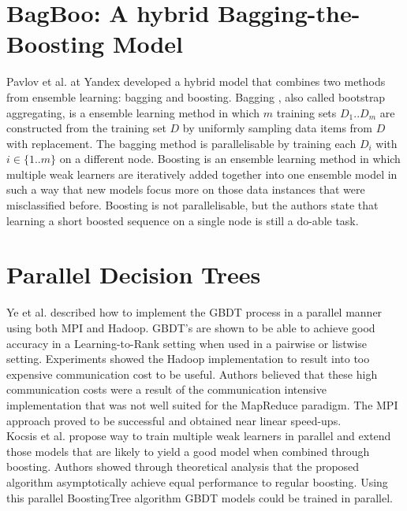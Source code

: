 \section{BagBoo: A hybrid Bagging-the-Boosting Model}
Pavlov et al. \cite{Pavlov2010} at Yandex developed a hybrid model that combines two methods from ensemble learning: bagging and boosting. Bagging \cite{Breiman1996}, also called bootstrap aggregating, is a ensemble learning method in which $m$ training sets $D_1..D_m$ are constructed from the training set $D$ by uniformly sampling data items from $D$ with replacement. The bagging method is parallelisable by training each $D_i$ with $i \in \{1..m\}$ on a different node. Boosting \cite{Friedman2002} is an ensemble learning method in which multiple weak learners are iteratively added together into one ensemble model in such a way that new models focus more on those data instances that were misclassified before. Boosting is not parallelisable, but the authors state that learning a short boosted sequence on a single node is still a do-able task.
\section{Parallel Decision Trees}
Ye et al. \cite{Ye2009} described how to implement the \ac{GBDT} process in a parallel manner using both MPI and Hadoop. \ac{GBDT}'s are shown to be able to achieve good accuracy in a Learning-to-Rank setting when used in a pairwise \cite{Zheng2007} or listwise \cite{Chen2008} setting. Experiments showed the Hadoop implementation to result into too expensive communication cost to be useful. Authors believed that these high communication costs were a result of the communication intensive implementation that was not well suited for the MapReduce paradigm. The MPI approach proved to be successful and obtained near linear speed-ups.\\

Kocsis et al. \cite{Kocsis2013} propose way to train multiple weak learners in parallel and extend those models that are likely to yield a good model when combined through boosting. Authors showed through theoretical analysis that the proposed algorithm asymptotically achieve equal performance to regular boosting. Using this parallel BoostingTree algorithm \ac{GBDT} models could be trained in parallel.\\

